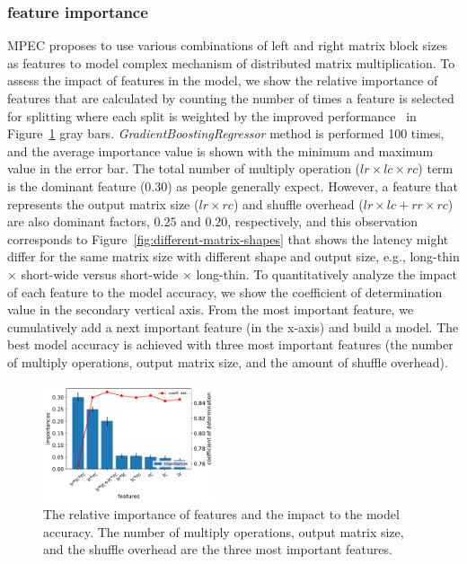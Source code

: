 \documentclass[10pt, conference, compsocconf]{IEEEtran}
\begin{document}
\subsubsection{feature importance} MPEC proposes to use various combinations of left and right matrix block sizes as features to model complex mechanism of distributed matrix multiplication. To assess the impact of features in the model, we show the relative importance of features that are calculated by counting the number of times a feature is selected for splitting where each split is weighted by the improved performance~\cite{gb-feature-importance} in Figure~\ref{fig:feature-importance} gray bars. \emph{GradientBoostingRegressor} method is performed 100 times, and the average importance value is shown with the minimum and maximum value in the error bar. The total number of multiply operation ($lr \times lc \times rc$) term is the dominant feature (0.30) as people generally expect. However, a feature that represents the output matrix size ($lr \times rc$) and shuffle overhead ($lr \times lc + rr \times rc$) are also dominant factors, $0.25$ and $0.20$, respectively, and this observation corresponds to Figure~\ref{fig:different-matrix-shapes} that shows the latency might differ for the same matrix size with different shape and output size, e.g., long-thin $\times$ short-wide versus short-wide $\times$ long-thin. To quantitatively analyze the impact of each feature to the model accuracy, we show the coefficient of determination value in the secondary vertical axis. From the most important feature, we cumulatively add a next important feature (in the x-axis) and build a model. The best model accuracy is achieved with three most important features (the number of multiply operations, output matrix size, and the amount of shuffle overhead).

\begin{figure}
  \centering\includegraphics[width=0.45\textwidth]{figures/feature-importance.pdf}\caption{The relative importance of features and the impact to the model accuracy. The number of multiply operations, output matrix size, and  the shuffle overhead are the three most important features.}\label{fig:feature-importance}
\end{figure}
\end{document}
